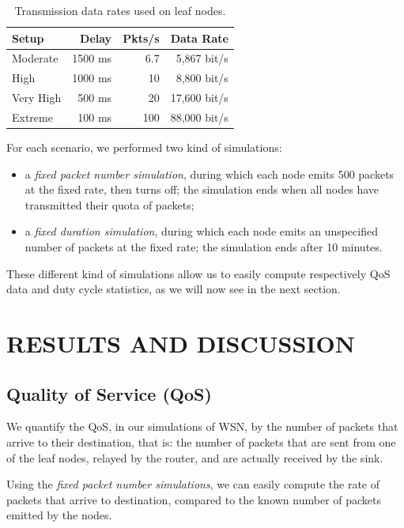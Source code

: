\documentclass[a4paper,twoside]{article}
\begin{document}
\begin{table}[htb]
\centering
\begin{tabular}{|l|r|r|r|}
\hline
Setup     &  Delay  & Pkts/s & Data Rate \\
\hline
Moderate  & 1500 ms &   6.7  &  5,867 bit/s \\ 
High      & 1000 ms &  10    &  8,800 bit/s \\
Very High &  500 ms &  20    & 17,600 bit/s \\
Extreme   &  100 ms & 100    & 88,000 bit/s \\
\hline
\end{tabular}
\caption{Transmission data rates used on leaf nodes.}
\label{TblDataRates}
\end{table}

For each scenario, we performed two kind of simulations:
\begin{itemize}
\item a \emph{fixed packet number simulation}, during which each node emits
500 packets at the fixed rate, then turns off; the simulation ends when all
nodes have transmitted their quota of packets;

\item a \emph{fixed duration simulation}, during which each node emits an
unspecified number of packets at the fixed rate; the simulation ends after
10 minutes.
\end{itemize}

These different kind of simulations allow us to easily compute respectively
QoS data and duty cycle statistics, as we will now see in the next section.



\section{\uppercase{Results and Discussion}}

\subsection{Quality of Service (QoS)}

We quantify the QoS, in our simulations of WSN, by the number of packets
that arrive to their destination, that is: the number of packets that are
sent from one of the leaf nodes, relayed by the router, and are actually
received by the sink.

Using the \emph{fixed packet number simulations}, we can easily compute the
rate of packets that arrive to destination, compared to the known number
of packets emitted by the nodes.
\end{document}
